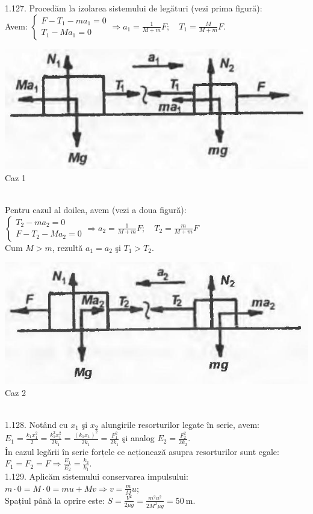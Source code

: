 1.127. Procedăm la izolarea sistemului de legături (vezi prima figură):\\ Avem: $\left\{\begin{array}{l}F-T_{1}-m a_{1}=0 \\ T_{1}-M a_{1}=0\end{array} \Rightarrow a_{1}=\frac{1}{M+m} F; \quad T_{1}=\frac{M}{M+m} F\right.$.\\ \begin{center} \includegraphics[width=0.4\linewidth]{images/2025_07_01_5b3ff9fa0d508c8e9f17g-225} Caz 1 \end{center}\\ Pentru cazul al doilea, avem (vezi a doua figură):\\ $\left\{\begin{array}{l}T_{2}-m a_{2}=0 \\ F-T_{2}-M a_{2}=0\end{array} \Rightarrow a_{2}=\frac{1}{M+m} F; \quad T_{2}=\frac{m}{M+m} F\right.$\\ Cum $M>m$, rezultă $a_{1}=a_{2}$ şi $T_{1}>T_{2}$.\\ \begin{center} \includegraphics[width=0.4\linewidth]{images/2025_07_01_5b3ff9fa0d508c8e9f17g-225(2)} Caz 2 \end{center}\\

1.128. Notând cu $x_{1}$ şi $x_{2}$ alungirile resorturilor legate în serie, avem:\\ $E_{1}=\frac{k_{1} x_{1}^{2}}{2}=\frac{k_{1}^{2} x_{1}^{2}}{2 k_{1}}=\frac{\left(k_{1} x_{1}\right)^{2}}{2 k_{1}}=\frac{F_{1}^{2}}{2 k_{1}}$ şi analog $E_{2}=\frac{F_{2}^{2}}{2 k_{2}}$.\\ În cazul legării în serie forțele ce acționează asupra resorturilor sunt egale:\\ $F_{1}=F_{2}=F \Rightarrow \frac{E_{1}}{E_{2}}=\frac{k_{2}}{k_{1}}$.\\

1.129. Aplicăm sistemului conservarea impulsului:\\ $m \cdot 0=M \cdot 0=m u+M v \Rightarrow v=\frac{m}{M} u$;\\ Spațiul până la oprire este: $S=\frac{V^{2}}{2 \mu g}=\frac{m^{2} u^{2}}{2 M^{2} \mu g}=50 \mathrm{~m}$.\\

